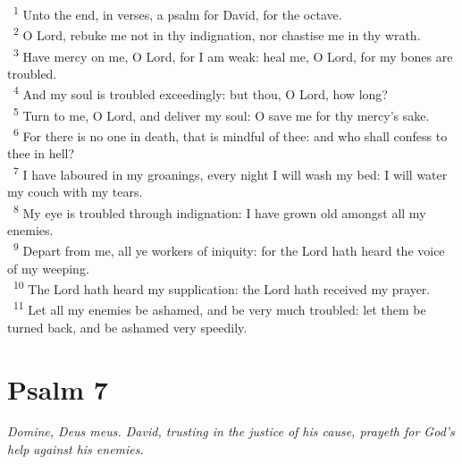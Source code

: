 \documentclass[a5paper,12pt]{article}
\begin{document}
\begin{multicols*}{2}
~\textsuperscript{1} Unto the end, in verses, a psalm for David, for the octave.\\
~\textsuperscript{2} O Lord, rebuke me not in thy indignation, nor chastise me in thy wrath.\\
~\textsuperscript{3} Have mercy on me, O Lord, for I am weak: heal me, O Lord, for my bones are troubled.\\
~\textsuperscript{4} And my soul is troubled exceedingly: but thou, O Lord, how long?\\
~\textsuperscript{5} Turn to me, O Lord, and deliver my soul: O save me for thy mercy's sake.\\
~\textsuperscript{6} For there is no one in death, that is mindful of thee: and who shall confess to thee in hell?\\
~\textsuperscript{7} I have laboured in my groanings, every night I will wash my bed: I will water my couch with my tears.\\
~\textsuperscript{8} My eye is troubled through indignation: I have grown old amongst all my enemies.\\
~\textsuperscript{9} Depart from me, all ye workers of iniquity: for the Lord hath heard the voice of my weeping.\\
~\textsuperscript{10} The Lord hath heard my supplication: the Lord hath received my prayer.\\
~\textsuperscript{11} Let all my enemies be ashamed, and be very much troubled: let them be turned back, and be ashamed very speedily.\\

\section{Psalm 7}
\label{sec:org6657152}
\emph{Domine, Deus meus. David, trusting in the justice of his cause, prayeth for God's help against his enemies.}\\


\end{multicols*}
\end{document}
